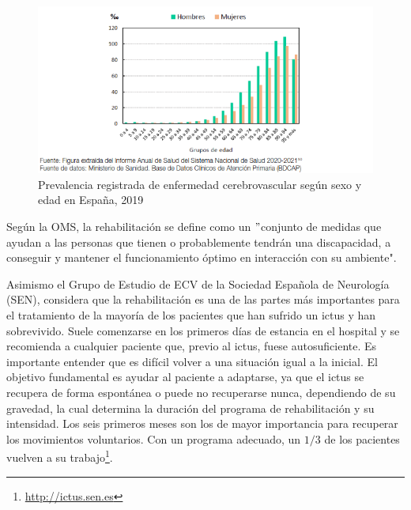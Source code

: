 \begin{figure}[ht!]
	\centering
	\begin{minipage}{0.95\linewidth}
		\centering
		\includegraphics[width=\linewidth]{figs/edad_ictus_es.png}
	\end{minipage}
	\caption[Prevalencia registrada de enfermedad cerebrovascular según sexo y edad en España, 2019]{Prevalencia registrada de enfermedad cerebrovascular según sexo y edad en España, 2019}
	\label{fig:grafica}
\end{figure}

Según la OMS, la rehabilitación se define como un $"$conjunto de medidas que ayudan a las personas que tienen o probablemente tendrán una discapacidad, a conseguir y mantener el funcionamiento óptimo en interacción con su ambiente".

Asimismo el Grupo de Estudio de ECV de la Sociedad Española de Neurología (SEN), considera que la rehabilitación es una de las partes más importantes para el tratamiento de la mayoría de los pacientes que han sufrido un ictus y han sobrevivido.
Suele comenzarse en los primeros días de estancia en el hospital y se recomienda a cualquier paciente que, previo al ictus, fuese autosuficiente.
Es importante entender que es difícil volver a una situación igual a la inicial.
El objetivo fundamental es ayudar al paciente a adaptarse, ya que el ictus se recupera de forma espontánea o puede no recuperarse nunca, dependiendo de su gravedad, la cual determina la duración del programa de rehabilitación y su intensidad.
Los seis primeros meses son los de mayor importancia para recuperar los movimientos voluntarios.
Con un programa adecuado, un $1/3$ de los pacientes vuelven a su trabajo\footnote{\url{http://ictus.sen.es}}.

